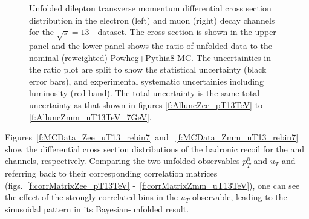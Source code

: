 \begin{figure}[h]
\centering
{}


\caption{Unfolded dilepton transverse momentum differential cross section distribution in the electron (left) and muon (right) \Zboson decay channels for the $\sqrt{s} = 13$~\TeV\ dataset. The cross section is shown in the upper panel and the lower panel shows the ratio of unfolded data to the nominal (reweighted) Powheg+Pythia8 MC. The uncertainties in the ratio plot are split to show the statistical uncertainty (black error bars), and experimental systematic uncertainies including luminosity (red band). The total uncertainty is the same total uncertainty as that shown in figures \ref{f:AlluncZee_pT13TeV} to \ref{f:AlluncZmm_uT13TeV_7GeV}.}\end{figure}


Figures~\ref{f:MCData_Zee_uT13_rebin7} and ~\ref{f:MCData_Zmm_uT13_rebin7} show the differential cross section distributions of the hadronic recoil for the \Zee and \Zmm channels, respectively. Comparing the two unfolded observables $p_{T}^{ll}$ and $u_{T}$ and referring back to their corresponding correlation matrices (figs.~\ref{f:corrMatrixZee_pT13TeV} -~\ref{f:corrMatrixZmm_uT13TeV}), one can see the effect of the strongly correlated bins in the $u_{T}$ observable, leading to the sinusoidal pattern in its Bayesian-unfolded result.

